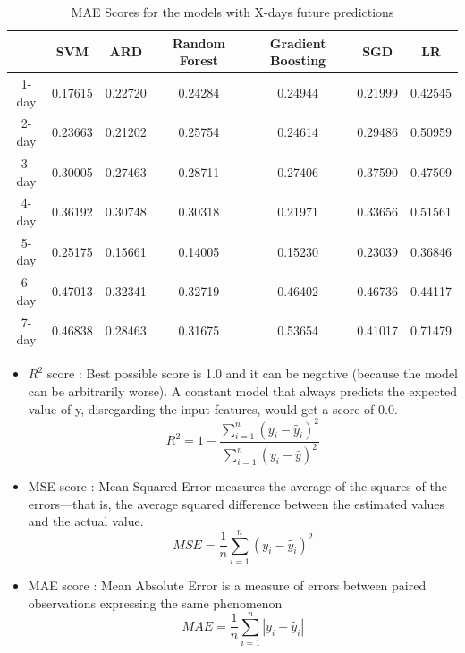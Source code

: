 \documentclass[12pt,a4paper]{article}
\begin{document}
\begin{table}[htb]
    \begin{tabular}{ |c|c|c|c|c|c|c| }
        \hline
         & SVM & ARD & Random Forest & Gradient Boosting & SGD & LR \\
        \hline
        1-day & 0.17615 & 0.22720 & 0.24284 & 0.24944 & 0.21999 & 0.42545 \\
        \hline
        2-day & 0.23663 & 0.21202 & 0.25754 & 0.24614 & 0.29486 & 0.50959 \\
        \hline
        3-day & 0.30005 & 0.27463 & 0.28711 & 0.27406 & 0.37590 & 0.47509  \\
        \hline
        4-day & 0.36192 & 0.30748 & 0.30318 & 0.21971 & 0.33656 & 0.51561 \\
        \hline
        5-day & 0.25175 & 0.15661 & 0.14005 & 0.15230 & 0.23039 & 0.36846 \\
        \hline
        6-day & 0.47013 & 0.32341 & 0.32719 & 0.46402 & 0.46736 & 0.44117 \\
        \hline
        7-day & 0.46838 & 0.28463 & 0.31675 & 0.53654 & 0.41017 & 0.71479 \\
        \hline 
        \end{tabular}
        \caption{MAE Scores for the models with X-days future predictions}
\end{table}
\newpage
\begin{itemize}
    \item $R^2$ score : Best possible score is 1.0 and it can be negative (because the model can be arbitrarily worse). A constant model that always predicts the expected value of y, disregarding the input features, would get a score of 0.0.
        \begin{equation}
            R^2 = 1 - \frac{\sum_{i=1}^{n}(y_i - \tilde{y_i})^2}{\sum_{i=1}^{n}(y_i - \bar{y})^2} 
        \end{equation}
    \item MSE score : Mean Squared Error measures the average of the squares of the errors—that is, the average squared difference between the estimated values and the actual value. 
        \begin{equation}
            MSE = \frac{1}{n}\sum_{i=1}^{n}(y_i - \tilde{y_i})^2
        \end{equation}
    \item MAE score : Mean Absolute Error is a measure of errors between paired observations expressing the same phenomenon
    \begin{equation}
        MAE = \frac{1}{n}\sum_{i=1}^{n}|y_i - \tilde{y_i}|
    \end{equation}
\end{itemize}
\end{document}
